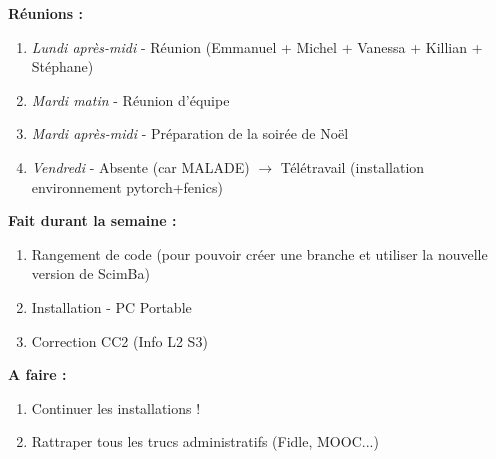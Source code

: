 \textbf{Réunions :}
\begin{enumerate}[label=\textbullet]
	\item \textit{Lundi après-midi} - Réunion (Emmanuel + Michel + Vanessa + Killian + Stéphane)
	\item \textit{Mardi matin} - Réunion d'équipe
	\item \textit{Mardi après-midi} - Préparation de la soirée de Noël
	\item \textit{Vendredi} - Absente (car MALADE) $\rightarrow$ Télétravail (installation environnement pytorch+fenics)
\end{enumerate}
\textbf{Fait durant la semaine :}
\begin{enumerate}[label=\textbullet]
	\item Rangement de code (pour pouvoir créer une branche et utiliser la nouvelle version de ScimBa)
	\item Installation - PC Portable
	\item Correction CC2 (Info L2 S3)
\end{enumerate}
\textbf{A faire :}
\begin{enumerate}[label=\textbullet]
	\item Continuer les installations !
	\item Rattraper tous les trucs administratifs (Fidle, MOOC...)
\end{enumerate}